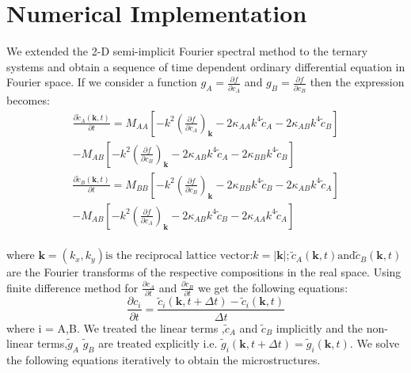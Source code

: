 \documentclass[12pt]{iiscthes}
\theoremstyle{definition}
\theoremstyle{definition}
\theoremstyle{remark}
\begin{document}
\section{Numerical Implementation}
We extended the 2-D semi-implicit Fourier spectral method to the ternary systems and obtain a sequence of time dependent ordinary differential equation in Fourier space. If we consider a function $ g_A = \frac{\partial f}{\partial c_A}$ and $ g_B = \frac{\partial f}{\partial c_B}$ then the expression becomes:\\
\begin{eqnarray}\label{68}
\frac{\partial\tilde{c}_A\left(\mathbf{k},t\right)}{\partial t} = M_{AA}\left[-k^2\left(\frac{\partial f}{\partial c_A}\right)_\mathbf{k}-2\kappa_{AA} k^4\tilde{c}_A-2\kappa_{AB}k^4\tilde{c}_B\right]\nonumber\\
-M_{AB}\left[-k^2\left(\frac{\partial f}{\partial c_B}\right)_\mathbf{k}-2\kappa_{AB}k^4\tilde{c}_A-2\kappa_{BB}k^4\tilde{c}_B\right]
\end{eqnarray}
\begin{eqnarray}\label{69}
\frac{\partial\tilde{c}_B\left(\mathbf{k},t\right)}{\partial t} = M_{BB}\left[-k^2\left(\frac{\partial f}{\partial c_B}\right)_\mathbf{k}-2\kappa_{BB} k^4\tilde{c}_B-2\kappa_{AB}k^4\tilde{c}_A\right]\nonumber\\
-M_{AB}\left[-k^2\left(\frac{\partial f}{\partial c_A}\right)_\mathbf{k}-2\kappa_{AB}k^4\tilde{c}_B-2\kappa_{AA}k^4\tilde{c}_A\right]
\end{eqnarray}
\\
 where $ \mathbf{k}=\left(k_x,k_y\right) \mbox {is the reciprocal lattice vector:} k=|\mathbf{k}|;\tilde{c}_A\left(\mathbf{k},t\right) \mbox{and} \tilde{c}_B\left(\mathbf{k},t\right) $ are the Fourier transforms of the respective compositions in the real space.
 Using finite difference method for $\frac{\partial c_A}{\partial t}$ and $\frac{\partial c_B}{\partial t}$ we get the following equations:
 \begin{equation}\label{70}
  \frac{\partial c_i}{\partial t}=\dfrac{\tilde{c}_i\left(\mathbf{k},t+\Delta t\right)-\tilde{c}_i\left(\mathbf{k},t\right)}{\Delta t} 
  \end{equation}
  where i = A,B. We treated the linear terms ,$\tilde{c}_A $ and $\tilde{c}_B $ implicitly and the non-linear terms,$\tilde{g}_A $  $\tilde{g}_B $ are treated explicitly i.e. $\tilde{g}_i\left(\mathbf{k},t+\Delta t\right)=\tilde{g}_i\left(\mathbf{k},t\right)$. We solve the following equations iteratively to obtain the microstructures.
\end{document}
